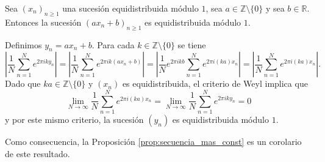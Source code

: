 \begin{example} 
    \label{ex:ax-b}
    Sea $(x_n)_{n\geq1}$ una sucesión equidistribuida módulo $1$, sea $a\in \mathbb{Z}\setminus\{0\}$ y sea $b\in\mathbb{R}$.
    Entonces la sucesión $(ax_n+b)_{n\geq1}$ es equidistribuida módulo $1$.
\end{example}

\begin{resolve}
    Definimos $y_n = ax_n+b$. Para cada $k \in \mathbb{Z}\setminus\{0\}$ se tiene
    \[
        \left|\frac{1}{N}\sum_{n=1}^N e^{2\pi i k y_n} \right|
        = \left|\frac{1}{N}\sum_{n=1}^N e^{2\pi i k (ax_n + b)} \right|
        = \left|\frac{1}{N}e^{2\pi i k b}\sum_{n=1}^N e^{2\pi i (ka) x_n} \right|
        =\left|\frac{1}{N}\sum_{n=1}^N e^{2\pi i (ka) x_n} \right|.
    \]
    Dado que $ka \in \mathbb{Z}\setminus\{0\}$ y $(x_n)$ es equidistribuida, el criterio de Weyl implica que
    \[
        \lim_{N\to\infty} \frac{1}{N}\sum_{n=1}^N e^{2\pi i (ka) x_n} =
        \lim_{N\to\infty} \frac{1}{N}\sum_{n=1}^N e^{2\pi i k y_n} = 0
    \]
    y por este mismo criterio, la sucesión $(y_n)$ es equidistribuida módulo $1$.
\end{resolve}

Como consecuencia, la Proposición \ref{prop:secuencia_mas_const} es un corolario de este resultado.